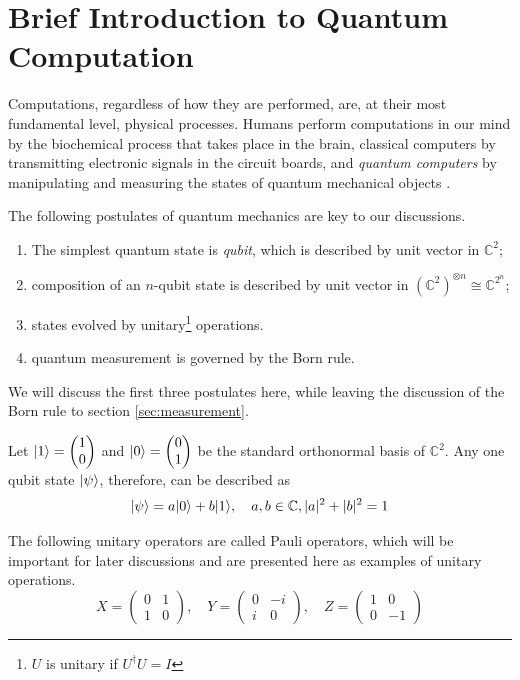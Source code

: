 \section{Brief Introduction to Quantum Computation}

Computations, regardless of how they are performed, are, at their most fundamental level, physical processes. 
Humans perform computations in our mind by the biochemical process that takes place in the brain, classical computers by transmitting electronic signals in the circuit boards, and \textit{quantum computers} by manipulating and measuring the states of quantum mechanical objects \cite{Nielsen_Chuang_2010}.

The following postulates \cite{Nielsen_Chuang_2010} of quantum mechanics are key to our discussions.
\begin{enumerate}[label={\textbf{Postulate} \arabic*}]
	\item The simplest quantum state is \textit{qubit}, which is described by unit vector in $\mathbb{C}^2$;
	\item composition of an $n$-qubit state is described by unit vector in $(\mathbb{C}^2)^{\otimes n} \cong \mathbb{C}^{2^n}$;
	\item states evolved by unitary\footnote{$U$ is unitary if $U^\dagger U = I$} operations.
	\item quantum measurement is governed by the Born rule.
\end{enumerate}

We will discuss the first three postulates here, while leaving the discussion of the Born rule to section \ref{sec:measurement}.

Let $|1\rangle = \begin{pmatrix}1 \\ 0\end{pmatrix}$ and $|0\rangle = \begin{pmatrix}0 \\ 1\end{pmatrix}$ be the standard orthonormal basis of $\mathbb{C}^2$.
Any one qubit state $|\psi\rangle$, therefore, can be described as 
$$
|\psi\rangle = a|0\rangle + b|1\rangle, \quad a, b \in \mathbb{C}, |a|^2 + |b|^2 = 1
$$

The following unitary operators are called Pauli operators, which will be important for later discussions and are presented here as examples of unitary operations.
\begin{equation}\label{eq:pauli}
	X = \begin{pmatrix}
0 & 1\\
1 & 0
\end{pmatrix}, \quad Y = \begin{pmatrix}0 & -i\\
i & 0
\end{pmatrix}, \quad Z = \begin{pmatrix}1 & 0\\
0 & -1
\end{pmatrix}
\end{equation}

